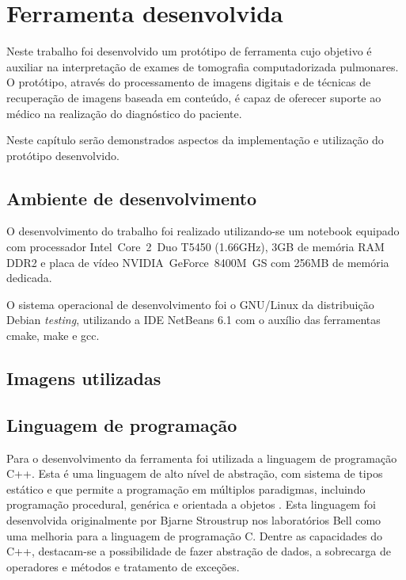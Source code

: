 \chapter{Ferramenta desenvolvida}

Neste trabalho foi desenvolvido um protótipo de ferramenta cujo objetivo é auxiliar na interpretação de exames de tomografia computadorizada pulmonares. O protótipo, através do processamento de imagens digitais e de técnicas de recuperação de imagens baseada em conteúdo, é capaz de oferecer suporte ao médico na realização do diagnóstico do paciente.

Neste capítulo serão demonstrados aspectos da implementação e utilização do protótipo desenvolvido.

\section{Ambiente de desenvolvimento}

O desenvolvimento do trabalho foi realizado utilizando-se um notebook equipado com processador Intel\textregistered~Core\texttrademark~2~Duo T5450 (1.66GHz), 3GB de memória RAM DDR2 e placa de vídeo NVIDIA\textregistered~GeForce\texttrademark~8400M~GS com 256MB de memória dedicada.

O sistema operacional de desenvolvimento foi o GNU/Linux da distribuição Debian \textit{testing}, utilizando a IDE NetBeans 6.1 com o auxílio das ferramentas cmake, make e gcc.

\section{Imagens utilizadas}



\section{Linguagem de programação}

Para o desenvolvimento da ferramenta foi utilizada a linguagem de programação C++. Esta é uma linguagem de alto nível de abstração, com sistema de tipos estático e que permite a programação em múltiplos paradigmas, incluindo programação procedural, genérica e orientada a objetos \cite{stroustrup2000}. Esta linguagem foi desenvolvida originalmente por Bjarne Stroustrup nos laboratórios Bell como uma melhoria para a linguagem de programação C. Dentre as capacidades do C++, destacam-se a possibilidade de fazer abstração de dados, a sobrecarga de operadores e métodos e tratamento de exceções.

